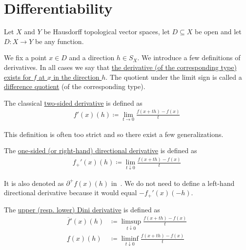\section{Differentiability}\label{sec:differentiability}

Let $X$ and $Y$ be Hausdorff topological vector spaces, let $D \subseteq X$ be open and let $D: X \to Y$ be any function.

\begin{definition}\label{def:derivatives}
  We fix a point $x \in D$ and a direction $h \in S_X$. We introduce a few definitions of derivatives. In all cases we say that \ul{the derivative (of the corresponding type) exists for $f$ at $x$ in the direction $h$}. The quotient under the limit sign is called a \ul{difference quotient} (of the corresponding type).

  \begin{defenum}
    \item\label{def:derivatives/classical} The classical \ul{two-sided derivative} is defined as
    \begin{align*}
      f'(x)(h) \coloneqq \lim_{t \to 0} \frac {f(x + th) - f(x)} t
    \end{align*}

    This definition is often too strict and so there exist a few generalizations.

    \item\label{def:derivatives/onesided}\cite[lemma 1.2]{Phelps1993} The \ul{one-sided (or right-hand) directional derivative} is defined as
    \begin{align*}
      f_+'(x)(h) \coloneqq \lim_{t \downarrow 0} \frac {f(x + th) - f(x)} t
    \end{align*}

    It is also denoted as $\partial^+ f(x)(h)$ in~\cite[lemma 1.2]{Phelps1993}. We do not need to define a left-hand directional derivative because it would equal $-f_+'(x)(-h)$.

    \item\label{def:derivatives/dini}\cite[definition 11.18]{Clarke2013} The \ul{upper (resp. lower) Dini derivative} is defined as
    \begin{align*}
      \overline f'(x)(h) &\coloneqq \limsup_{t \downarrow 0} \frac {f(x + th) - f(x)} t
      \\
      \underline f(x)(h) &\coloneqq \liminf_{t \downarrow 0} \frac {f(x + th) - f(x)} t
    \end{align*}


\end{defenum}
\end{definition}
